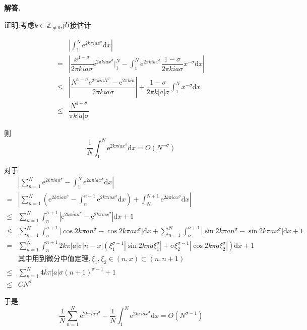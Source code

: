 \documentclass[12pt, a4paper, oneside]{ctexart}
\newenvironment{solution}{\par\noindent\textbf{解答. }}{\par}
\begin{document}
\begin{solution}
\par
证明:考虑$k \in \mathbb{Z}_{\neq 0} $,直接估计
\par
$$
\begin{aligned}
&\left|\int_{1}^{N}\mathrm{e}^{2k\pi i a x^{\sigma}}\mathrm{d}x \right|\\
=&\left|\dfrac{x^{1-\sigma}}{2\pi kia\sigma}\mathrm{e}^{2\pi kia x^{\sigma}}\bigg|^N_1-\int_{1}^{N}\mathrm{e}^{2\pi ki a x^{\sigma}}\dfrac{1-\sigma}{2\pi k i a\sigma}x^{-\sigma}\mathrm{d}x\right|\\
\leqslant &\left|\dfrac{N^{1-\sigma}\mathrm{e}^{2\pi kiaN^\sigma}-\mathrm{e}^{2\pi kia}}{2\pi kia \sigma}\right|+\dfrac{1-\sigma}{2\pi k|a|\sigma}\int_{1}^{N}x^{-\sigma}\mathrm{d}x\\
\leqslant &\dfrac{N^{1-\sigma}}{\pi k|a| \sigma}
\end{aligned}
$$
\par
则$$
\dfrac{1}{N}\int_{1}^{N}\mathrm{e}^{2k\pi i a x^{\sigma}}\mathrm{d}x=O(N^{-\sigma})
$$
\par
对于
$$
\begin{aligned}
&\left|\sum_{n=1}^{N}\mathrm{e}^{2k\pi i a n^{\sigma}}-\int_{1}^{N}\mathrm{e}^{2k \pi i a x^{\sigma}}\mathrm{d}x \right|\\
=&\left|\sum_{n=1}^{N}\left(\mathrm{e}^{2k\pi ia n^{\sigma}}-\int_{n}^{n+1}\mathrm{e}^{2k\pi i a x^{\sigma}}\mathrm{d}x\right)+\int_{N}^{N+1}\mathrm{e}^{2k\pi iax^{\sigma}}\mathrm{d}x\right|\\
\leqslant  & \sum_{n=1}^{N}\int_{n}^{n+1}\left|\mathrm{e}^{2k\pi ia n^{\sigma}}-\mathrm{e}^{2k\pi i a x^{\sigma}}\right|\mathrm{d}x+1\\
\leqslant &\sum_{n=1}^{N}\int_{n}^{n+1}|\cos 2k\pi a n^\sigma-\cos 2k \pi a x^\sigma|\mathrm{d}x+\sum_{n=1}^{N}\int_{n}^{n+1}|\sin 2k\pi a n^\sigma-\sin 2k \pi a x^\sigma|\mathrm{d}x+1\\
=&\sum_{n=1}^{N}\int_{n}^{n+1}2k \pi |a| \sigma|n-x|\left( \xi_1^{\sigma-1}|\sin 2k\pi a \xi_1^{\sigma}|+\sigma \xi_2^{\sigma-1}|\cos 2k\pi a \xi_2^{\sigma}|\right)\mathrm{d}x+1 \\
&\text{其中用到微分中值定理}, \xi_1,\xi_2 \in (n,x)\subset (n,n+1)\\
\leqslant& \sum_{n=1}^{N}4k\pi |a|\sigma (n+1)^{\sigma-1}+1\\
\leqslant & CN^{\sigma}
\end{aligned}
$$
\par
于是
$$
\dfrac{1}{N}\sum_{n=1}^{N}\mathrm{e}^{2k\pi ia n^\sigma}-\dfrac{1}{N}\int_{1}^{N}\mathrm{e}^{2k\pi i ax^{\sigma}}\mathrm{d}x=O(N^{\sigma-1})
$$
\end{solution}
\end{document}
